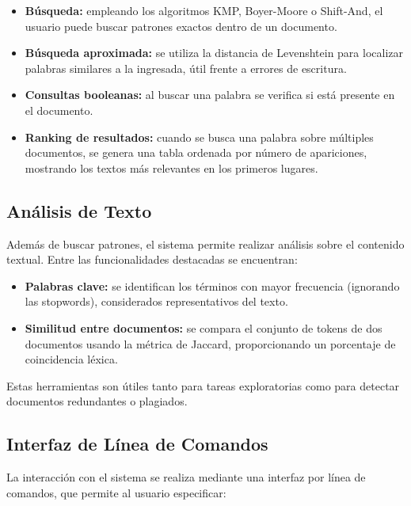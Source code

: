 \documentclass[9pt,letterpaper,onecolumn]{rho-class/rho}
\begin{document}
\begin{itemize}
    \item \textbf{Búsqueda:} empleando los algoritmos KMP, Boyer-Moore o Shift-And, el usuario puede buscar patrones exactos dentro de un documento.
    \item \textbf{Búsqueda aproximada:} se utiliza la distancia de Levenshtein para localizar palabras similares a la ingresada, útil frente a errores de escritura.
    \item \textbf{Consultas booleanas:} al buscar una palabra se verifica si está presente en el documento.
    \item \textbf{Ranking de resultados:} cuando se busca una palabra sobre múltiples documentos, se genera una tabla ordenada por número de apariciones, mostrando los textos más relevantes en los primeros lugares.
\end{itemize}

\subsection{Análisis de Texto}

Además de buscar patrones, el sistema permite realizar análisis sobre el contenido textual. Entre las funcionalidades destacadas se encuentran:

\begin{itemize}
    \item \textbf{Palabras clave:} se identifican los términos con mayor frecuencia (ignorando las stopwords), considerados representativos del texto.
    \item \textbf{Similitud entre documentos:} se compara el conjunto de tokens de dos documentos usando la métrica de Jaccard, proporcionando un porcentaje de coincidencia léxica.
\end{itemize}

Estas herramientas son útiles tanto para tareas exploratorias como para detectar documentos redundantes o plagiados.

\subsection{Interfaz de Línea de Comandos}

La interacción con el sistema se realiza mediante una interfaz por línea de comandos, que permite al usuario especificar:
\end{document}
